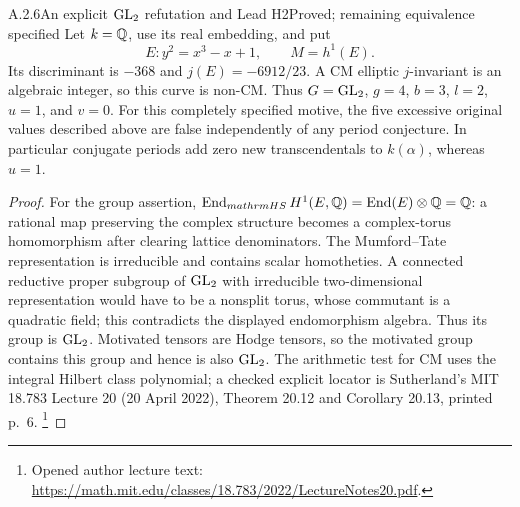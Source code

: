 \begin{result}{A.2.6}{An explicit $\operatorname{GL}_2$ refutation and Lead H2}{Proved; remaining equivalence specified}
Let $k=\mathbb Q$, use its real embedding, and put
\[
                 E:y^2=x^3-x+1,\qquad M=h^1(E).
\]
Its discriminant is $-368$ and $j(E)=-6912/23$. A CM elliptic
$j$-invariant is an algebraic integer, so this curve is non-CM.
Thus $G=\operatorname{GL}_2$, $g=4$, $b=3$, $l=2$, $u=1$, and $v=0$.
For this completely specified motive, the five excessive original
values described above are false independently of any period
conjecture. In particular conjugate periods add zero new
transcendentals to $k(\alpha)$, whereas $u=1$.
\end{result}

\begin{proof}
For the group assertion, $\operatorname{End}_{mathrm{HS}}H^1(E,\mathbb Q)
=\operatorname{End}(E)\otimes\mathbb Q=\mathbb Q$: a rational map preserving the complex
structure becomes a complex-torus homomorphism after clearing
lattice denominators. The Mumford--Tate representation is
irreducible and contains scalar homotheties. A connected reductive
proper subgroup of $\operatorname{GL}_2$ with irreducible two-dimensional
representation would have to be a nonsplit torus, whose commutant
is a quadratic field; this contradicts the displayed endomorphism
algebra. Thus its group is $\operatorname{GL}_2$. Motivated tensors are Hodge
tensors, so the motivated group contains this group and hence is
also $\operatorname{GL}_2$. The arithmetic test for CM uses the integral Hilbert
class polynomial; a checked explicit locator is Sutherland's
MIT 18.783 Lecture 20 (20 April 2022), Theorem 20.12 and Corollary
20.13, printed p.~6.
\footnote{Opened author lecture text:
\url{https://math.mit.edu/classes/18.783/2022/LectureNotes20.pdf}.}


\end{proof}
